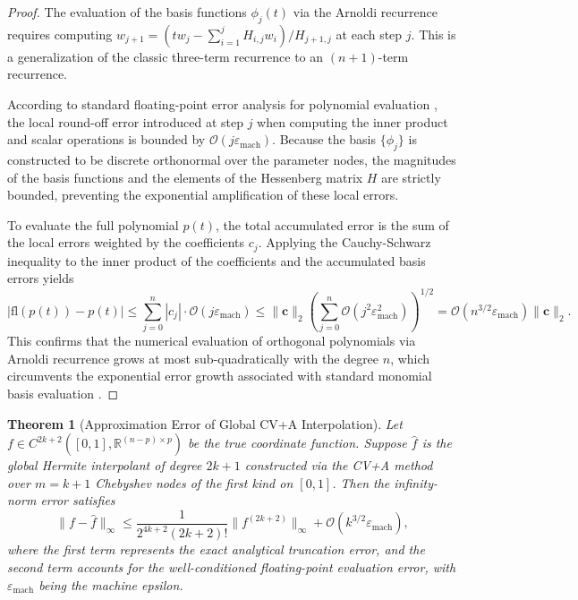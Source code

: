 \documentclass[11pt]{article}
\newtheorem{theorem}{Theorem}
\begin{document}
\begin{proof}
The evaluation of the basis functions $\phi_j(t)$ via the Arnoldi recurrence requires computing $w_{j+1} = (t w_j - \sum_{i=1}^j H_{i,j} w_i) / H_{j+1,j}$ at each step $j$. This is a generalization of the classic three-term recurrence to an $(n+1)$-term recurrence. 

According to standard floating-point error analysis for polynomial evaluation \cite{higham2002accuracy}, the local round-off error introduced at step $j$ when computing the inner product and scalar operations is bounded by $\mathcal{O}(j \varepsilon_{\text{mach}})$. Because the basis $\{\phi_j\}$ is constructed to be discrete orthonormal over the parameter nodes, the magnitudes of the basis functions and the elements of the Hessenberg matrix $H$ are strictly bounded, preventing the exponential amplification of these local errors.

To evaluate the full polynomial $p(t)$, the total accumulated error is the sum of the local errors weighted by the coefficients $c_j$. Applying the Cauchy-Schwarz inequality to the inner product of the coefficients and the accumulated basis errors yields
\begin{equation}
|\text{fl}(p(t)) - p(t)| \leq \sum_{j=0}^n |c_j| \cdot \mathcal{O}(j \varepsilon_{\text{mach}}) \leq \|\mathbf{c}\|_2 \left( \sum_{j=0}^n \mathcal{O}(j^2 \varepsilon_{\text{mach}}^2) \right)^{1/2} = \mathcal{O}(n^{3/2} \varepsilon_{\text{mach}}) \|\mathbf{c}\|_2.
\end{equation}
This confirms that the numerical evaluation of orthogonal polynomials via Arnoldi recurrence grows at most sub-quadratically with the degree $n$, which circumvents the exponential error growth associated with standard monomial basis evaluation \cite{brubeck2021vandermonde}.
\end{proof}






\begin{theorem}[Approximation Error of Global CV+A Interpolation] \label{thm:approx_order}
Let $f \in C^{2k+2}([0,1], \mathbb{R}^{(n-p) \times p})$ be the true coordinate function. Suppose $\hat{f}$ is the global Hermite interpolant of degree $2k+1$ constructed via the CV+A method over $m = k+1$ Chebyshev nodes of the first kind on $[0,1]$. Then the infinity-norm error satisfies
\begin{equation} \label{eq:alg_error}
\|f - \hat{f}\|_\infty \leq \frac{1}{2^{4k+2} (2k+2)!} \|f^{(2k+2)}\|_\infty + \mathcal{O}(k^{3/2} \varepsilon_{\text{mach}}),
\end{equation}
where the first term represents the exact analytical truncation error, and the second term accounts for the well-conditioned floating-point evaluation error, with $\varepsilon_{\text{mach}}$ being the machine epsilon.
\end{theorem}
\end{document}

